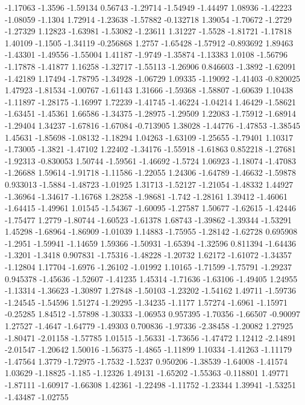 \documentclass[9pt]{article}
\theoremstyle{plain}
\theoremstyle{definition}
\theoremstyle{remark}
\numberwithin{equation}{section}
\begin{document}
-1.17063
-1.3596
-1.59134
0.56743
-1.29714
-1.54949
-1.44497
1.08936
-1.42223
-1.08059
-1.1304
1.72914
-1.23638
-1.57882
-0.132718
1.39054
-1.70672
-1.2729
-1.27329
1.12823
-1.63981
-1.53082
-1.23611
1.31227
-1.5528
-1.81721
-1.17818
1.40109
-1.1505
-1.34119
-0.256868
1.2757
-1.65428
-1.57912
-0.893692
1.89463
-1.43301
-1.49556
-1.55004
1.41187
-1.9749
-1.35874
-1.13383
1.0108
-1.56796
-1.17878
-1.41877
1.16258
-1.32717
-1.55113
-1.26906
0.846603
-1.3892
-1.62091
-1.42189
1.17494
-1.78795
-1.34928
-1.06729
1.09335
-1.19092
-1.41403
-0.820025
1.47923
-1.81534
-1.00767
-1.61143
1.31666
-1.59368
-1.58807
-1.60639
1.10438
-1.11897
-1.28175
-1.16997
1.72239
-1.41745
-1.46224
-1.04214
1.46429
-1.58621
-1.63451
-1.45361
1.66586
-1.34375
-1.28975
-1.29509
1.22083
-1.75912
-1.68914
-1.29404
1.34237
-1.67816
-1.67084
-0.713905
1.38028
-1.44776
-1.47853
-1.38545
1.45631
-1.85698
-1.08132
-1.18294
1.04263
-1.63109
-1.25655
-1.79401
1.10317
-1.73005
-1.3821
-1.47102
1.22402
-1.34176
-1.55918
-1.61863
0.852218
-1.27681
-1.92313
-0.830053
1.50744
-1.59561
-1.46692
-1.5724
1.06923
-1.18074
-1.47083
-1.26688
1.59614
-1.91718
-1.11586
-1.22055
1.24306
-1.64789
-1.46632
-1.59878
0.933013
-1.5884
-1.48723
-1.01925
1.31713
-1.52127
-1.21054
-1.48332
1.44927
-1.36964
-1.34617
-1.16768
1.28258
-1.98681
-1.742
-1.28161
1.39412
-1.46061
-1.64415
-1.49961
1.01545
-1.54367
-1.60095
-1.27587
1.50677
-1.62615
-1.42446
-1.75477
1.2779
-1.80744
-1.60523
-1.61378
1.68743
-1.39862
-1.39344
-1.53291
1.45298
-1.68964
-1.86909
-1.01039
1.14883
-1.75955
-1.28142
-1.62728
0.695908
-1.2951
-1.59941
-1.14659
1.59366
-1.50931
-1.65394
-1.32596
0.811394
-1.64436
-1.3201
-1.3418
0.907831
-1.75316
-1.48228
-1.20732
1.62172
-1.61072
-1.34357
-1.12804
1.17704
-1.6976
-1.26102
-1.01992
1.10165
-1.71599
-1.75791
-1.29237
0.945378
-1.45636
-1.52607
-1.41235
1.45314
-1.71636
-1.63106
-1.49405
1.24955
-1.13314
-1.36623
-1.30897
1.27848
-1.50103
-1.23202
-1.54162
1.49711
-1.59736
-1.24545
-1.54596
1.51274
-1.29295
-1.34235
-1.1177
1.57274
-1.6961
-1.15971
-0.25285
1.84512
-1.57898
-1.30333
-1.06953
0.957395
-1.70356
-1.66507
-0.90097
1.27527
-1.4647
-1.64779
-1.49303
0.700836
-1.97336
-2.38458
-1.20082
1.27925
-1.80471
-2.01158
-1.57785
1.01515
-1.56331
-1.73656
-1.47472
1.12412
-2.14891
-2.01547
-1.20642
1.50016
-1.56375
-1.4865
-1.11899
1.10334
-1.41263
-1.11179
-1.47564
1.3779
-1.72975
-1.7532
-1.5237
0.950206
-1.38539
-1.64008
-1.41574
1.03629
-1.18825
-1.185
-1.12326
1.49131
-1.65202
-1.55363
-0.118801
1.49771
-1.87111
-1.60917
-1.66308
1.42361
-1.22498
-1.11752
-1.23344
1.39941
-1.53251
-1.43487
-1.02755
\end{document}
